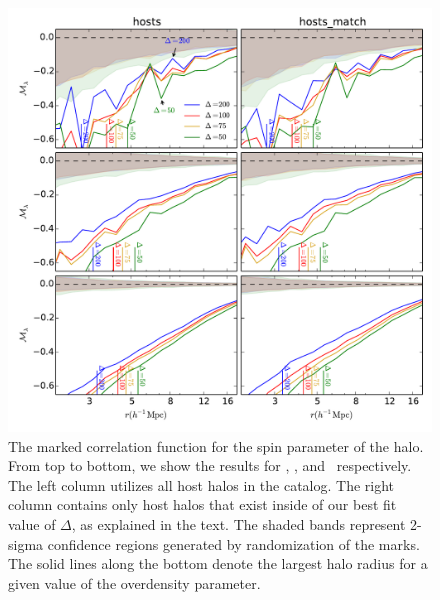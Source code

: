 \documentclass[usenatbib,usegraphicx,letterpaper]{mn2e}
\begin{document}
\begin{figure}
	\centering
	\includegraphics[width=\textwidth]{all_mcf_spin_z00_hostsvmatch.pdf}
	\caption{The marked correlation function for the spin parameter of the halo. From top to bottom, we show the results for \simA, \simB, and \simC \ respectively. The left column utilizes all host halos in the catalog. The right column contains only host halos that exist inside of our best fit value of $\Delta$, as explained in the text. The shaded bands represent 2-sigma confidence regions generated by randomization of the marks. The solid lines along the bottom denote the largest halo radius for a given value of the overdensity parameter.}
	\label{fig:hvm_mcf_spin}
\end{figure}
\end{document}
